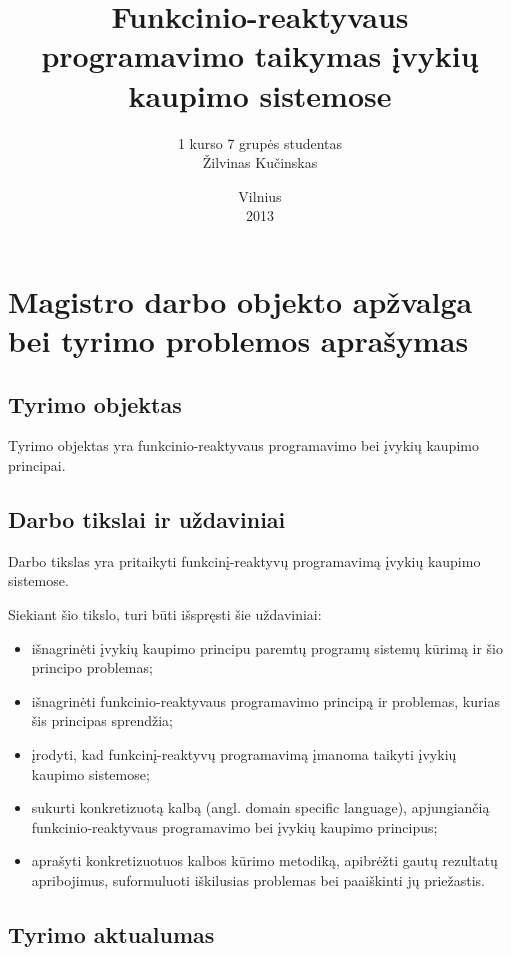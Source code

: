 \documentclass[12pt, a4paper, lithuanian]{article}
\title{Funkcinio-reaktyvaus programavimo taikymas įvykių kaupimo sistemose}
\author{
    1 kurso 7 grupės studentas \\
    Žilvinas Kučinskas
}
\date{Vilnius \\ 2013}
\begin{document}
\maketitle

\tableofcontents

\section{Magistro darbo objekto apžvalga bei tyrimo problemos aprašymas}

\subsection{Tyrimo objektas}

    Tyrimo objektas yra funkcinio-reaktyvaus programavimo bei įvykių kaupimo principai.

\subsection{Darbo tikslai ir uždaviniai}

    Darbo tikslas yra pritaikyti funkcinį-reaktyvų programavimą įvykių kaupimo sistemose.

    Siekiant šio tikslo, turi būti išspręsti šie uždaviniai:

\begin{itemize}
        \item išnagrinėti įvykių kaupimo principu paremtų programų sistemų kūrimą ir šio
                principo problemas;
        \item išnagrinėti funkcinio-reaktyvaus programavimo principą ir
            problemas, kurias šis principas sprendžia;
        \item įrodyti, kad funkcinį-reaktyvų programavimą įmanoma taikyti įvykių
            kaupimo sistemose;
        \item sukurti konkretizuotą kalbą (angl. domain specific language), apjungiančią funkcinio-reaktyvaus programavimo
            bei įvykių kaupimo principus;
        \item aprašyti konkretizuotuos kalbos kūrimo metodiką, apibrėžti gautų rezultatų apribojimus, suformuluoti iškilusias problemas bei paaiškinti jų priežastis.
\end{itemize}

\subsection{Tyrimo aktualumas}
\end{document}

